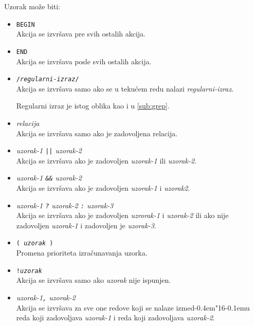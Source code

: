 \documentclass[12pt,a4paper]{article}
\def\d{d\kern-0.4em\char"16\kern-0.1em}
\begin{document}
        Uzorak mo\v ze biti:
        \begin{itemize}
        \item
          {\tt BEGIN}\\
          Akcija se izvr\v sava pre svih ostalih akcija.
        \item
          {\tt END}\\
          Akcija se izvr\v sava posle svih ostalih akcija.
        \item
          {\tt/{\it regularni-izraz}/}\\
          Akcija se izvr\v sava samo ako se u teku\'cem redu nalazi
          {\it regularni-izraz}.

          Regularni izraz je istog oblika kao i u \ref{sub:grep}.
        \item
          {\it relacija}\\
          Akcija se izvr\v sava samo ako je zadovoljena relacija.
        \item
          {\it uzorak-1 {\tt||} uzorak-2}\\
          Akcija se izvr\v sava ako je zadovoljen {\it uzorak-1} ili
          {\it uzorak-2}.
        \item
          {\it uzorak-1 {\tt\&\&} uzorak-2}\\
          Akcija se izvr\v sava ako je zadovoljen {\it uzorak-1} i
          {\it uzorak2}.
        \item
          {\it uzorak-1 {\tt?} uzorak-2 {\tt:} uzorak-3}\\
          Akcija se izvr\v sava ako je zadovoljen {\it uzrorak-1} i {\it
          uzorak-2} ili ako nije zadovoljen {\it uzorak-1} i zadovoljen je
          {\it uzorak-3}.
        \item
          {\tt( {\it uzorak} )}\\
          Promena prioriteta izra\v cunavanja uzorka.
        \item
          {\tt!{\it uzorak}}\\
          Akcija se izvr\v sava samo ako {\it uzorak} nije ispunjen.
        \item
          {\it uzorak-1{\tt,} uzorak-2}\\
          Akcija se izvr\v sava za sve one redove koji se nalaze izme\d u
          reda koji zadovoljava {\it uzorak-1} i reda koji zadovoljava
          {\it uzorak-2}.
        \end{itemize}
\end{document}

